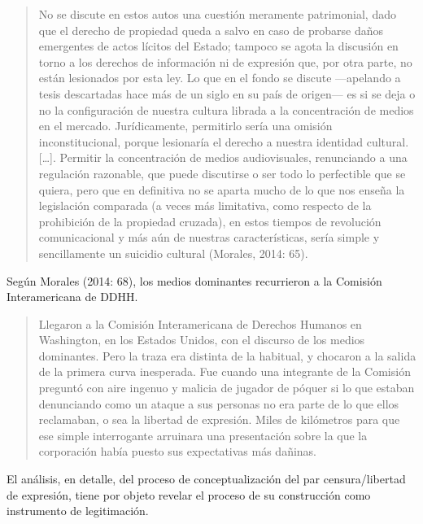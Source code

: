 \begin{quote}
No se discute en estos autos una cuestión meramente patrimonial, dado que el derecho de propiedad queda a salvo en caso de probarse daños emergentes de actos lícitos del Estado; tampoco se agota la discusión en torno a los derechos de información ni de expresión que, por otra parte, no están lesionados por esta ley. Lo que en el fondo se discute ---apelando a tesis descartadas hace más de un siglo en su país de origen--- es si se deja o no la configuración de nuestra cultura librada a la concentración de medios en el mercado. Jurídicamente, permitirlo sería una omisión inconstitucional, porque lesionaría el derecho a nuestra identidad cultural.{[}\ldots{]}. Permitir la concentración de medios audiovisuales, renunciando a una regulación razonable, que puede discutirse o ser todo lo perfectible que se quiera, pero que en definitiva no se aparta mucho de lo que nos enseña la legislación comparada (a veces más limitativa, como respecto de la prohibición de la propiedad cruzada), en estos tiempos de revolución comunicacional y más aún de nuestras características, sería simple y sencillamente un suicidio cultural (Morales, 2014: 65).
\end{quote}

Según Morales (2014: 68), los medios dominantes recurrieron a la Comisión Interamericana de DDHH.

\begin{quote}
Llegaron a la Comisión Interamericana de Derechos Humanos en Washington, en los Estados Unidos, con el discurso de los medios dominantes. Pero la traza era distinta de la habitual, y chocaron a la salida de la primera curva inesperada. Fue cuando una integrante de la Comisión preguntó con aire ingenuo y malicia de jugador de póquer si lo que estaban denunciando como un ataque a sus personas no era parte de lo que ellos reclamaban, o sea la libertad de expresión. Miles de kilómetros para que ese simple interrogante arruinara una presentación sobre la que la corporación había puesto sus expectativas más dañinas.
\end{quote}

El análisis, en detalle, del proceso de conceptualización del par censura/libertad de expresión, tiene por objeto revelar el proceso de su construcción como instrumento de legitimación.

